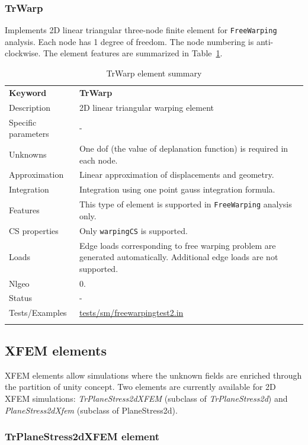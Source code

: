 \documentclass[a4paper]{article}
\newcommand{\param}[1]{\texttt{#1}} %
\newcommand{\templabel}{}%
\newcommand{\tempcaption}{}%
\newcounter{nelpar}
\newenvironment{elementsummary}[5]{%
  \gdef\tempcaption{#4}%
  \gdef\templabel{#5}%
  \setcounter{nelpar}{0}%
  \begin{center} %
    \begin{table}[!htb] %
      \begin{tabular}{|l|p{9cm}|}\hline %
        {\bf Keyword} & \bf{#1}\\ %
        {Description} & {#2}\\ %
        {Specific parameters} & {#3}\\ \hline %
}{
  \\ \hline %
      \end{tabular}%
      \caption{\tempcaption}%
      \label{\templabel}%
    \end{table}%
  \end{center}%
}
\newcommand{\elementDescription}[2]{{#1} & {#2}\\}
\begin{document}
\subsubsection{TrWarp}
Implements 2D linear triangular three-node finite element for \param{FreeWarping} analysis. Each node has 1 degree of freedom.
The node numbering is anti-clockwise. The element features are summarized in Table~\ref{TrWarpsummary}.


\begin{elementsummary}{TrWarp}{2D linear triangular warping element}{-}{TrWarp element summary}{TrWarpsummary}
\elementDescription{Unknowns}{One dof (the value of deplanation function) is required in each node.}
\elementDescription{Approximation}{Linear approximation of displacements and geometry.}
\elementDescription{Integration}{Integration using one point gauss integration formula.}
\elementDescription{Features}{This type of element is supported in \param{FreeWarping} analysis only.}
\elementDescription{CS properties}{Only \param{warpingCS} is supported.}
\elementDescription{Loads}{Edge loads corresponding to free warping problem are generated automatically. Additional edge loads are not supported.}
\elementDescription{Nlgeo}{0.}
\elementDescription{Status}{-}
\elementDescription{Tests/Examples}{\href{https://github.com/oofem/oofem/blob/devel/tests/sm/freewarpingtest2.in}{tests/sm/freewarpingtest2.in}}
\end{elementsummary}

\clearpage
\subsection{XFEM elements}
XFEM elements allow simulations where the unknown fields are enriched through
the partition of unity concept. Two elements are currently available for 2D XFEM
simulations: \textit{TrPlaneStress2dXFEM} (subclass of \textit{TrPlaneStress2d})
and \textit{PlaneStress2dXfem} (subclass of PlaneStress2d).

\subsubsection{TrPlaneStress2dXFEM element}
\end{document}
